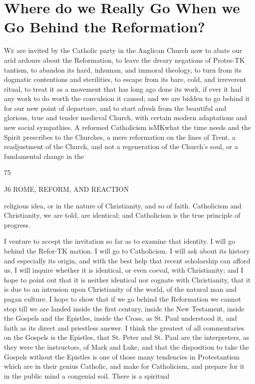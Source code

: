 \documentclass[12pt,a5paper,twoside]{book}
\begin{document}
\chapter{Where do we Really Go When we Go Behind the Reformation?}


\textsc{We} are invited by the Catholic party in the Anglican 
Church now to abate our arid ardours about the 
Reformation, to leave the dreary negations of Protes-TK
tantism, to abandon its hard, inhuman, and immoral 
theology, to turn from its dogmatic contentions and 
sterilities, to escape from its bare, cold, and irreverent 
ritual, to treat it as a movement that has long ago 
done its work, if ever it had any work to do worth the 
convulsion it caused; and we are bidden to go behind 
it for our new point of departure, and to start afresh 
from the beautiful and glorious, true and tender 
medieval Church, with certain modern adaptations 
and new social sympathies. A reformed Catholicism 
isMKwhat the time needs and the Spirit prescribes to the 
Churches, a mere reformation on the lines of Trent, a 
readjustment of the Church, and not a regeneration 
of the Church's soul, or a fundamental change in the 

75 



J6 ROME, REFORM, AND REACTION 

religious idea, or in the nature of Christianity, and so 
of faith. Catholicism and Christianity, we are told, 
are identical; and Catholicism is the true principle 
of progress. 

I venture to accept the invitation so far as to 
examine that identity. I will go behind the Refor-TK
mation. I will go to Catholicism. I will ask about 
its history and especially its origin, and with the best 
help that recent scholarship can afford us, I will 
inquire whether it is identical, or even coeval, with 
Christianity; and I hope to point out that it is 
neither identical nor cognate with Christianity, that 
it is due to an intrusion upon Christianity of the 
world, of the natural man and pagan culture. I hope 
to show that if we go behind the Reformation we 
cannot stop till we are landed inside the first century, 
inside the New Testament, inside the Gospels and 
the Epistles, inside the Cross, as St. Paul understood 
it, and faith as its direct and priestless answer. I 
think the greatest of all commentaries on the Gospels 
is the Epistles, that St. Peter and St. Paul are the 
interpreters, as they were the instructors, of Mark and 
Luke, and that the disposition to take the Gospels 
without the Epistles is one of those many tendencies 
in Protestantism which are in their genius Catholic, 
and make for Catholicism, and prepare for it in the 
public mind a congenial soil. There is a spiritual 
\end{document}
